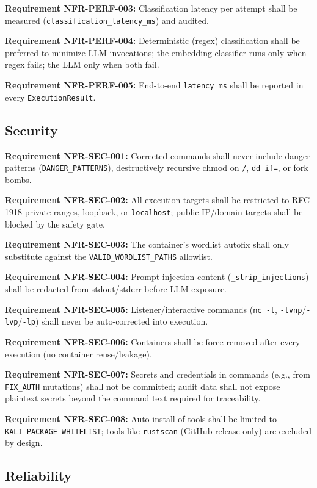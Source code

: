 \documentclass[10pt,journal,onecolumn]{IEEEtran}
\newcommand{\reqid}[1]{\textbf{#1}}
\begin{document}
\reqid{Requirement NFR-PERF-003:} Classification latency per attempt shall be measured (\texttt{classification\_\allowbreak latency\_\allowbreak ms}) and audited.

\reqid{Requirement NFR-PERF-004:} Deterministic (regex) classification shall be preferred to minimize LLM invocations; the embedding classifier runs only when regex fails; the LLM only when both fail.

\reqid{Requirement NFR-PERF-005:} End-to-end \texttt{latency\_ms} shall be reported in every \texttt{ExecutionResult}.

\subsection{Security}

\reqid{Requirement NFR-SEC-001:} Corrected commands shall never include danger patterns (\texttt{DANGER\_PATTERNS}), destructively recursive chmod on \texttt{/}, \texttt{dd if=}, or fork bombs.

\reqid{Requirement NFR-SEC-002:} All execution targets shall be restricted to RFC-1918 private ranges, loopback, or \texttt{localhost}; public-IP/domain targets shall be blocked by the safety gate.

\reqid{Requirement NFR-SEC-003:} The container's wordlist autofix shall only substitute against the \texttt{VALID\_WORDLIST\_PATHS} allowlist.

\reqid{Requirement NFR-SEC-004:} Prompt injection content (\texttt{\_strip\_injections}) shall be redacted from stdout/stderr before LLM exposure.

\reqid{Requirement NFR-SEC-005:} Listener/interactive commands (\texttt{nc -l}, \texttt{-lvnp}/\texttt{-lvp}/\texttt{-lp}) shall never be auto-corrected into execution.

\reqid{Requirement NFR-SEC-006:} Containers shall be force-removed after every execution (no container reuse/leakage).

\reqid{Requirement NFR-SEC-007:} Secrets and credentials in commands (e.g., from \texttt{FIX\_AUTH} mutations) shall not be committed; audit data shall not expose plaintext secrets beyond the command text required for traceability.

\reqid{Requirement NFR-SEC-008:} Auto-install of tools shall be limited to \texttt{KALI\_PACKAGE\_WHITELIST}; tools like \texttt{rustscan} (GitHub-release only) are excluded by design.

\subsection{Reliability}
\end{document}
